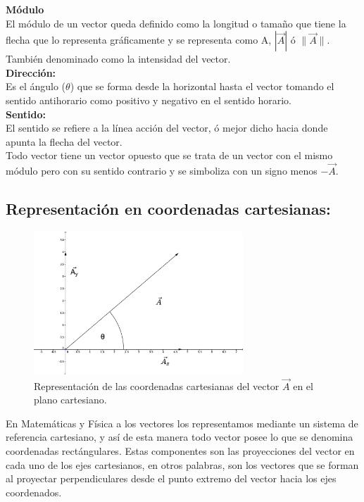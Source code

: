 \textbf{Módulo}\\

El módulo de un vector queda definido como la longitud o tamaño que tiene la flecha que lo representa gráficamente y se 
representa como A, $|\vec{A}|$ ó $\|\vec{A}\|$. También denominado como la intensidad del vector.\\

\textbf{Dirección:}\\

Es el ángulo ($\theta$) que se forma desde la horizontal hasta el vector tomando el sentido antihorario como positivo y negativo 
en el sentido horario.\\

\textbf{Sentido:}\\

El sentido se refiere a la línea acción del vector, ó mejor dicho hacia donde apunta la flecha del vector.\\

Todo vector tiene un vector opuesto que se trata de un vector con el mismo módulo pero con su sentido contrario y se 
simboliza con un signo menos $-\vec{A}$.\\

\subsection{Representación en coordenadas cartesianas:}

\begin{figure}[H]
   \centering
\includegraphics[width=0.7\textwidth]{images/vector_dos.eps}
  \caption{\small{Representación de las coordenadas cartesianas del vector $\vec{A}$ en el plano cartesiano.}}
   \end{figure}

En Matemáticas y Física a los vectores los representamos mediante un sistema de referencia cartesiano, y así de esta 
manera todo vector posee lo que se denomina coordenadas rectángulares. Estas componentes son las proyecciones del 
vector en cada uno de los ejes cartesianos, en otros palabras, son los vectores que se forman al proyectar 
perpendiculares desde el punto extremo del vector hacia los ejes coordenados.\\



